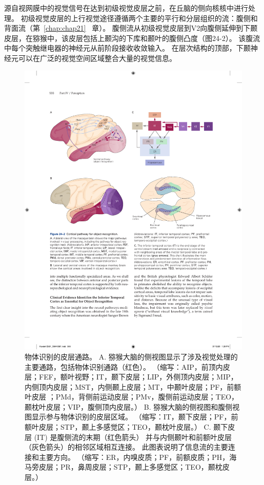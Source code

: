 源自视网膜中的视觉信号在达到初级视觉皮层之前，在丘脑的侧向核核中进行处理。
初级视觉皮层的上行视觉途径遵循两个主要的平行和分层组织的流：腹侧和背面流（第~\ref{chap:chap21}~ 章）。
腹侧流从初级视觉皮层到V2向腹侧延伸到下颞皮层，在猕猴中，该皮层包括上颞沟的下库和颞叶的腹侧凸度（图24-2）。
该腹流中每个突触继电器的神经元从前阶段接收收敛输入。
在层次结构的顶部，下颞神经元可以在广泛的视觉空间区域整合大量的视觉信息。


\begin{figure}[htbp]
	\centering
	\includegraphics[width=0.95\linewidth]{chap24/fig_24_2}
	\caption{物体识别的皮层通路。
		A. 猕猴大脑的侧视图显示了涉及视觉处理的主要通路，包括物体识别通路（红色）。
		（缩写：AIP，前顶内皮层；FEF，额叶视野；IT，颞下皮层；LIP，外侧顶内皮层；MIP，内侧顶内皮层；MST，内侧颞上皮层；MT，中颞叶皮层；PF，前额叶皮层 ；PMd，背侧前运动皮层；PMv，腹侧前运动皮层；TEO，颞枕叶皮层；VIP，腹侧顶内皮层。）
		B. 猕猴大脑的侧视图和腹侧视图显示参与物体识别的皮层区域。
		（缩写：IT，颞下皮层；PF，前额叶皮层；STP，颞上多感觉区；TEO，颞枕叶皮层。）
		C. 颞下皮层 (IT) 是腹侧流的末期（红色箭头） 并与内侧颞叶和前额叶皮层（灰色箭头）的相邻区域相互连接。 
		此图表说明了信息流的主要连接和主要方向。 
		（缩写：ER，内嗅皮质；PF，前额皮质；PH，海马旁皮层；PR，鼻周皮层；STP，颞上多感觉区；TEO，颞枕皮层。）}
	\label{fig:24_2}
\end{figure}


